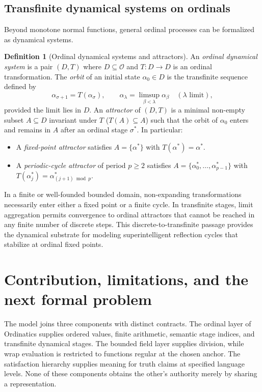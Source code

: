 \documentclass[11pt]{article}
\theoremstyle{definition}
\newtheorem{definition}[theorem]{Definition}
\newcommand{\Ord}{\mathcal O}
\begin{document}
\subsection{Transfinite dynamical systems on ordinals}
Beyond monotone normal functions, general ordinal processes can be formalized as dynamical systems.

\begin{definition}[Ordinal dynamical systems and attractors]
An \emph{ordinal dynamical system} is a pair $(D, T)$ where $D \subseteq \Ord$ and $T\colon D \to D$ is an ordinal transformation. The \emph{orbit} of an initial state $\alpha_0 \in D$ is the transfinite sequence defined by
\[
\alpha_{\sigma+1} = T(\alpha_\sigma), \qquad \alpha_\lambda = \limsup_{\beta < \lambda} \alpha_\beta \quad (\lambda \text{ limit}),
\]
provided the limit lies in $D$. An \emph{attractor} of $(D, T)$ is a minimal non-empty subset $A \subseteq D$ invariant under $T$ ($T(A) \subseteq A$) such that the orbit of $\alpha_0$ enters and remains in $A$ after an ordinal stage $\sigma^*$. In particular:
\begin{itemize}
\item A \emph{fixed-point attractor} satisfies $A = \{\alpha^*\}$ with $T(\alpha^*) = \alpha^*$.
\item A \emph{periodic-cycle attractor} of period $p \ge 2$ satisfies $A = \{\alpha_0^*, \ldots, \alpha_{p-1}^*\}$ with $T(\alpha_j^*) = \alpha_{(j+1)\bmod p}^*$.
\end{itemize}
\end{definition}

In a finite or well-founded bounded domain, non-expanding transformations necessarily enter either a fixed point or a finite cycle. In transfinite stages, limit aggregation permits convergence to ordinal attractors that cannot be reached in any finite number of discrete steps. This discrete-to-transfinite passage provides the dynamical substrate for modeling superintelligent reflection cycles that stabilize at ordinal fixed points.

\section{Contribution, limitations, and the next formal problem}
The model joins three components with distinct contracts. The ordinal layer of Ordinatics supplies ordered values, finite arithmetic, semantic stage indices, and transfinite dynamical stages. The bounded field layer supplies division, while wrap evaluation is restricted to functions regular at the chosen anchor. The satisfaction hierarchy supplies meaning for truth claims at specified language levels. None of these components obtains the other's authority merely by sharing a representation.
\end{document}
